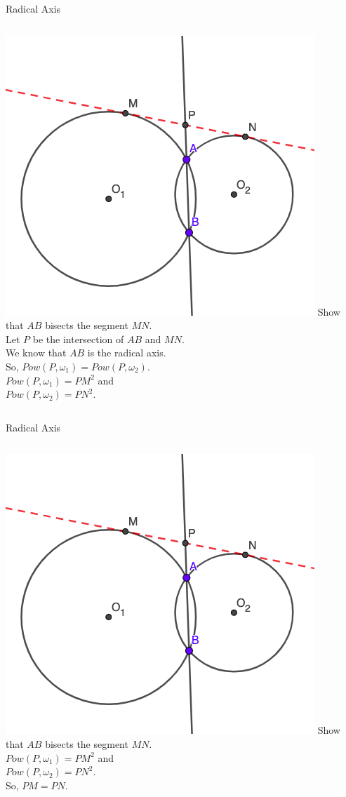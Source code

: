 \documentclass{beamer}
\begin{document}
\begin{frame}{Radical Axis}
	\begin{columns}
		\includegraphics[scale=0.4]{rad3.png}
		Show that $AB$ bisects the segment $MN$.\\
		\phantom{Spacing}
		Let $P$ be the intersection of $AB$ and $MN$.\\
		We know that $AB$ is the radical axis.\\
		So, $Pow(P, \omega_1) = Pow(P, \omega_2)$.\\
		\phantom{Spacing}
		$Pow(P,\omega_1) = PM^2$ and\\
		$Pow(P, \omega_2) = PN^2$.
	\end{columns}
\end{frame}
\begin{frame}{Radical Axis}
	\begin{columns}
		\column{0.6\textwidth}
		\includegraphics[scale=0.4]{rad3.png}
		\column{0.4\textwidth}
		Show that $AB$ bisects the segment $MN$.\\
		\phantom{Spacing}
		$Pow(P,\omega_1) = PM^2$ and\\
		$Pow(P, \omega_2) = PN^2$.\\
		\phantom{Spacing}
		So, $PM = PN$.
	\end{columns}
\end{frame}
\end{document}
